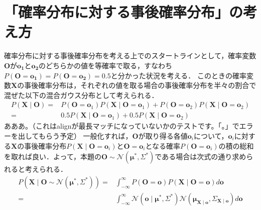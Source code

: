 \section{「確率分布に対する事後確率分布」の考え方}
​
確率分布に対する事後確率分布を考える上でのスタートラインとして，確率変数$\bm{O}$が$\bm{o_1}$と$\bm{o_2}$のどちらかの値を等確率で取る，すなわち$P(\bm{O} = \bm{o_1}) = P(\bm{O} = \bm{o_2}) = 0.5$と分かった状況を考える．
このときの確率変数$\bm{X}$の事後確率分布は，それぞれの値を取る場合の事後確率分布を半々の割合で混ぜた以下の混合ガウス分布として考えられる．
​
\begin{align}
  P\left( \bm{X} \mid \bm{O} \right) = & P\left( \bm{O} = \bm{o}_1 \right)P\left( \bm{X} \mid \bm{O} = \bm{o}_1 \right) + P\left( \bm{O} = \bm{o}_2 \right)P\left( \bm{X} \mid \bm{O} = \bm{o}_2 \right) \nonumber \\
  = & 0.5 P\left( \bm{X} \mid \bm{O} = \bm{o}_1 \right) + 0.5P\left( \bm{X} \mid \bm{O} = \bm{o}_2 \right)
\end{align}
あああ。（これはalignが最長マッチになっていないかのテストです。「。」でエラーを出してもらう予定）
\noindent 一般化すれば，$\bm{O}$が取り得る各値$\bm{o}_i$について，$\bm{o}_i$に対する$\bm{X}$の事後確率分布$P\left( \bm{X} \mid \bm{O} = \bm{o}_i \right)$と$\bm{O}=\bm{o}_i$となる確率$P\left( \bm{O}=\bm{o}_i \right)$の積の総和を取れば良い．
​
よって，本題の$\bm{O} \sim \mathcal{N}\left( \bm{\mu}^*, \Sigma^* \right)$である場合は次式の通り求められると考えられる．
​
\begin{align}
  P\left( \bm{X} \mid \bm{O} \sim \mathcal{N}\left( \bm{\mu}^*, \Sigma^* \right) \right) = & \int_{-\infty}^{\infty} P\left( \bm{O}=\bm{o} \right)P\left( \bm{X} \mid \bm{O} = \bm{o} \right) d\bm{o} \nonumber \\
  = & \int_{-\infty}^{\infty} \mathcal{N}\left( \bm{o} \mid \bm{\mu}^*, \Sigma^* \right) \mathcal{N}\left( \bm{\mu_{X \mid o}}, \Sigma_{\bm{X \mid o}} \right) d\bm{o}
\end{align}
​
